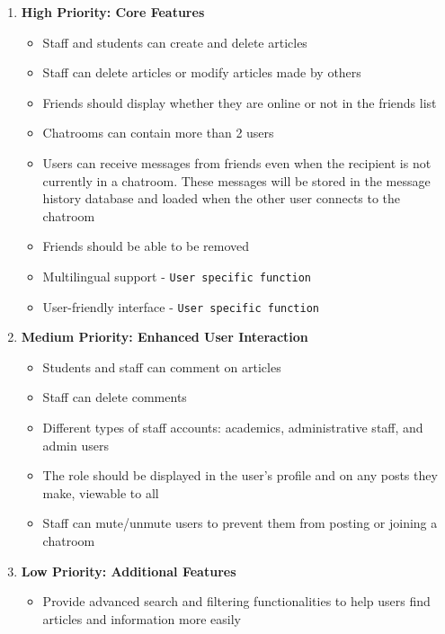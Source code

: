 \documentclass[12pt]{article}
\begin{document}
    \begin{enumerate}
    \item \textbf{High Priority: Core Features}
        \begin{itemize}
            \item Staff and students can create and delete articles
            \item Staff can delete articles or modify articles made by others
            \item Friends should display whether they are online or not in the friends list
            \item Chatrooms can contain more than 2 users
            \item Users can receive messages from friends even when the recipient is not currently in a chatroom. These messages will be stored in the message history database and loaded when the other user connects to the chatroom
            \item Friends should be able to be removed
            \item Multilingual support - \texttt{User specific function}
            \item User-friendly interface - \texttt{User specific function}
        \end{itemize}

    \item \textbf{Medium Priority: Enhanced User Interaction}
        \begin{itemize}
            \item Students and staff can comment on articles
            \item Staff can delete comments
            \item Different types of staff accounts: academics, administrative staff, and admin users
            \item The role should be displayed in the user’s profile and on any posts they make, viewable to all
            \item Staff can mute/unmute users to prevent them from posting or joining a chatroom
        \end{itemize}

    \item \textbf{Low Priority: Additional Features}
        \begin{itemize}

            \item Provide advanced search and filtering functionalities to help users find articles and information more easily
        \end{itemize}


    \end{enumerate}
\end{document}
